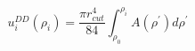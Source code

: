 


$$
 u_{i}^{DD}\left(\rho_{i}\right) = \frac{\pi r_{cut}^4}{84} \int_{\rho_0}^{\rho_i} A\left(\rho^{'}\right) d\rho^{'}
$$


